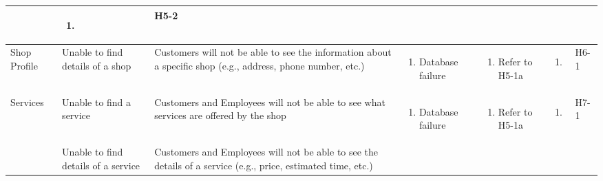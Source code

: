 \documentclass{article}
\begin{document}
\begin{landscape}
\begin{longtable}{|p{}|p{}|p{}|p{}|p{}|p{}|p{}|}
\begin{enumerate}[label=\alph*., leftmargin=*]
		   \end{enumerate}
		 & \begin{enumerate}[label=\alph*., leftmargin=*]
			   \item
		   \end{enumerate}
		 & H5-2                                                                                                         \\
		\hline
		Shop Profile
		 & Unable to find details of a shop
		 & Customers will not be able to see the information about a specific shop (e.g., address, phone number, etc.)
		 & \begin{enumerate}[label=\alph*., leftmargin=*]
			   \item Database failure
		   \end{enumerate}
		 & \begin{enumerate}[label=\alph*., leftmargin=*]
			   \item Refer to H5-1a
		   \end{enumerate}
		 & \begin{enumerate}[label=\alph*., leftmargin=*]
			   \item
		   \end{enumerate}
		 & H6-1                                                                                                         \\
		\hline
		\multirow{2}{*}{Services}
		 & Unable to find a service
		 & Customers and Employees will not be able to see what services are offered by the shop
		 & \begin{enumerate}[label=\alph*., leftmargin=*]
			   \item Database failure
		   \end{enumerate}
		 & \begin{enumerate}[label=\alph*., leftmargin=*]
			   \item Refer to H5-1a
		   \end{enumerate}
		 & \begin{enumerate}[label=\alph*., leftmargin=*]
			   \item
		   \end{enumerate}
		 & H7-1                                                                                                         \\
		\cline{2-7}
		~
		 & Unable to find details of a service
		 & Customers and Employees will not be able to see the details of a service (e.g., price, estimated time, etc.)
		 & \begin{enumerate}[label=\alph*., leftmargin=*]

\end{enumerate}
\end{longtable}
\end{landscape}
\end{document}
